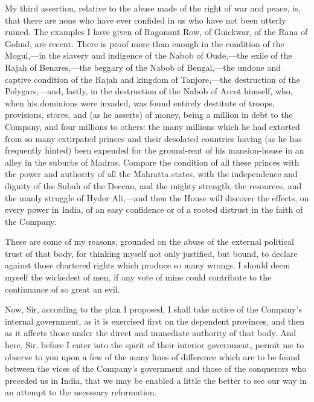 My third assertion, relative to the abuse made of the right of war and peace, is, that there are none who have ever confided in us who have not been utterly ruined. The examples I have given of Ragonaut Row, of Guickwar, of the Rana of Gohud, are recent. There is proof more than enough in the condition of the Mogul,—in the slavery and indigence of the Nabob of Oude,—the exile of the Rajah of Benares,—the beggary of the Nabob of Bengal,—the undone and captive condition of the Rajah and kingdom of Tanjore,—the destruction of the Polygars,—and, lastly, in the destruction of the Nabob of Arcot himself, who, when his dominions were invaded, was found entirely destitute of troops, provisions, stores, and (as he asserts) of money, being a million in debt to the Company, and four millions to others: the many millions which he had extorted from so many extirpated princes and their desolated countries having (as he has frequently hinted) been expended for the ground-rent of his mansion-house in an alley in the suburbs of Madras. Compare the condition of all these princes with the power and authority of all the Mahratta states, with the independence and dignity of the Subah of the Deccan, and the mighty strength, the resources, and the manly struggle of Hyder Ali,—and then the House will discover the effects, on every power in India, of an easy confidence or of a rooted distrust in the faith of the Company.

These are some of my reasons, grounded on the abuse of the external political trust of that body, for thinking myself not only justified, but bound, to declare against those chartered rights which produce so many wrongs. I should deem myself the wickedest of men, if any vote of mine could contribute to the continuance of so great an evil.

Now, Sir, according to the plan I proposed, I shall take notice of the Company's internal government, as it is exercised first on the dependent provinces, and then as it affects those under the direct and immediate authority of that body. And here, Sir, before I enter into the spirit of their interior government, permit me to observe to you upon a few of the many lines of difference which are to be found between the vices of the Company's government and those of the conquerors who preceded us in India, that we may be enabled a little the better to see our way in an attempt to the necessary reformation.

